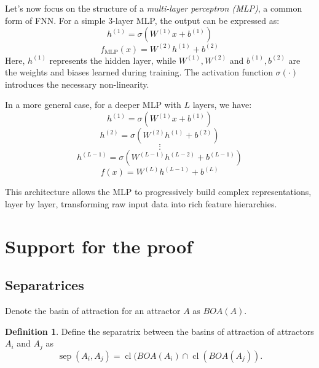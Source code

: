 \documentclass{article}
\theoremstyle{definition}
\newtheorem{definition}{Definition}
\theoremstyle{remark}
\newcommand{\sep}{\operatorname{sep}}
\newcommand{\cl}{\operatorname{cl}}
\begin{document}

Let’s now focus on the structure of a \textit{multi-layer perceptron (MLP)}, a common form of FNN. For a simple 3-layer MLP, the output can be expressed as:
\[
h^{(1)} = \sigma(W^{(1)} x + b^{(1)})
\]
\[
f_{\text{MLP}}(x) = W^{(2)} h^{(1)} + b^{(2)}
\]
Here, \(h^{(1)}\) represents the hidden layer, while \(W^{(1)}, W^{(2)}\) and \(b^{(1)}, b^{(2)}\) are the weights and biases learned during training. The activation function \(\sigma(\cdot)\) introduces the necessary non-linearity.




In a more general case, for a deeper MLP with \(L\) layers, we have:
\[
h^{(1)} = \sigma(W^{(1)} x + b^{(1)})
\]
\[
h^{(2)} = \sigma(W^{(2)} h^{(1)} + b^{(2)})
\]
\[
\vdots
\]
\[
h^{(L-1)} = \sigma(W^{(L-1)} h^{(L-2)} + b^{(L-1)})
\]
\[
f(x) = W^{(L)} h^{(L-1)} + b^{(L)}
\]

This architecture allows the MLP to progressively build complex representations, layer by layer, transforming raw input data into rich feature hierarchies.


\section{Support for the proof}
\subsection{Separatrices}

Denote the basin of attraction for an attractor $A$ as $BOA(A)$.

\begin{definition}	
Define the separatrix between the basins of attraction of attractors $A_i$ and $A_j$ as 
\begin{equation}
\sep(A_i,A_j) = \cl(BOA(A_i)\cap \cl(BOA(A_j)).
\end{equation}
\end{definition}
\end{document}
